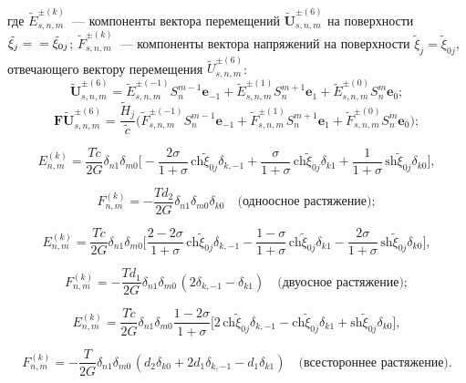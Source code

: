 \begin{russian}
\noindent где $\tilde E_{s,n,m}^{\pm(k)}$~--- компоненты вектора перемещений $\mathbf{\tilde U}_{s,n,m}^{\pm(6)}$ на поверхности $\tilde\xi_j=\\=\tilde\xi_{0j}$; $\tilde F_{s,n,m}^{\pm(k)}$~--- компоненты вектора напряжений на поверхности $\tilde\xi_j=\tilde\xi_{0j}$, отвечающего вектору перемещения $\tilde U_{s,n,m}^{\pm(6)}$:
$$
\mathbf{\tilde U}_{s,n,m}^{\pm(6)}=\tilde E_{s,n,m}^{\pm(-1)}S_n^{m-1}\mathbf{e}_{-1}+\tilde E_{s,n,m}^{\pm(1)}S_n^{m+1}\mathbf{e}_1+\tilde E_{s,n,m}^{\pm(0)}S_n^m\mathbf{e}_0;
$$
$$
\mathbf{F\tilde U}_{s,n,m}^{\pm(6)}=\frac{\tilde H_j}{\tilde c}\bigg(\tilde F_{s,n,m}^{\pm(-1)}S_n^{m-1}\mathbf{e}_{-1}+\tilde F_{s,n,m}^{\pm(1)}S_n^{m+1}\mathbf{e}_1+\tilde F_{s,n,m}^{\pm(0)}S_n^m\mathbf{e}_0\bigg);
$$

\begin{equation*}
E_{n,m}^{(k)} =\frac{T\tilde c}{2G}\delta_{n1}\delta_{m0}\bigg[-\frac{2\sigma}{1+\sigma}\,\mathrm{ch}\tilde\xi_{0j}\delta_{k,-1}+\frac{\sigma}{1+\sigma}\,\mathrm{ch}\tilde\xi_{0j}\delta_{k1}+\frac{1}{1+\sigma}\,\mathrm{sh}\tilde\xi_{0j}\delta_{k0}\bigg],
\end{equation*}

\begin{equation*}
F_{n,m}^{(k)} =  -\frac{Td_2}{2G}{\delta _{n1}}{\delta _{m0}}{\delta _{k0}}\quad\text{(одноосное растяжение)};
\end{equation*}

\begin{equation*}
E_{n,m}^{(k)} =\frac{T\tilde c}{2G}\delta_{n1}\delta_{m0}\bigg[\frac{2-2\sigma}{1+\sigma}\,\mathrm{ch}\tilde\xi_{0j}\delta_{k,-1}-\frac{1-\sigma}{1+\sigma}\,\mathrm{ch}\tilde\xi_{0j}\delta_{k1}-\frac{2\sigma}{1+\sigma}\,\mathrm{sh}\tilde\xi_{0j}\delta_{k0}\bigg],
\end{equation*}

\begin{equation*}
F_{n,m}^{(k)} =  -\frac{Td_1}{2G}{\delta _{n1}}{\delta _{m0\,}}(2{\delta _{k, - 1}} - {\delta _{k1}})\quad\text{(двуосное растяжение)};
\end{equation*}

\begin{equation*}
E_{n,m}^{(k)} =\frac{T\tilde c}{2G}\delta_{n1}\delta_{m0}\frac{1-2\sigma}{1+\sigma}\bigg[2\,\mathrm{ch}\tilde\xi_{0j}\delta_{k,-1}-\mathrm{ch}\tilde\xi_{0j}\delta_{k1}+\mathrm{sh}
\tilde\xi_{0j}\delta_{k0}\bigg],
\end{equation*}

\begin{equation*}
F_{n,m}^{(k)} =  -\frac{T}{2G}{\delta _{n1}}{\delta _{m0\,}}(d_2\delta_{k0}+2d_1{\delta _{k, - 1}} - d_1{\delta _{k1}})\quad\text{(всестороннее растяжение)}.
\end{equation*}


\end{russian}
